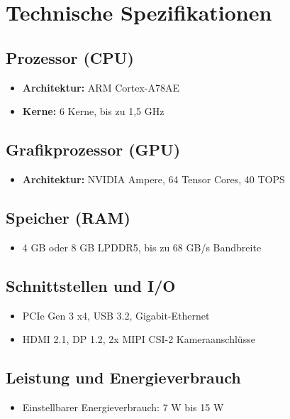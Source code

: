 \documentclass{article}
\begin{document}
\section{Technische Spezifikationen}

\subsection{Prozessor (CPU)}
\begin{itemize}
    \item \textbf{Architektur:} ARM Cortex-A78AE
    \item \textbf{Kerne:} 6 Kerne, bis zu 1,5 GHz
\end{itemize}

\subsection{Grafikprozessor (GPU)}
\begin{itemize}
    \item \textbf{Architektur:} NVIDIA Ampere, 64 Tensor Cores, 40 TOPS
\end{itemize}

\subsection{Speicher (RAM)}
\begin{itemize}
    \item 4 GB oder 8 GB LPDDR5, bis zu 68 GB/s Bandbreite
\end{itemize}

\subsection{Schnittstellen und I/O}
\begin{itemize}
    \item PCIe Gen 3 x4, USB 3.2, Gigabit-Ethernet
    \item HDMI 2.1, DP 1.2, 2x MIPI CSI-2 Kameraanschlüsse
\end{itemize}

\subsection{Leistung und Energieverbrauch}
\begin{itemize}
    \item Einstellbarer Energieverbrauch: 7 W bis 15 W
\end{itemize}
\end{document}
